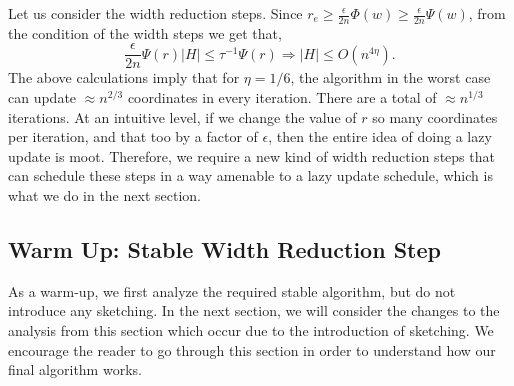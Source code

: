 \documentclass[11pt]{article}
\newcommand\rr{\boldsymbol{\mathit{r}}}
\newcommand\ww{\boldsymbol{\mathit{w}}}
\begin{document}
Let us consider the width reduction steps. Since $\rr_e\geq \frac{\epsilon}{2n}\Phi(\ww)\geq \frac{\epsilon}{2n}\Psi(\ww)$, from the condition of the width steps we get that,
\[
\frac{\epsilon}{2n}\Psi(\rr) |H| \leq\tau^{-1}\Psi(\rr) \Rightarrow |H|\leq O(n^{4\eta}).
\]
The above calculations imply that for $\eta = 1/6$, the algorithm in the worst case can update $\approx n^{2/3}$ coordinates in every iteration. There are a total of $\approx n^{1/3}$ iterations. At an intuitive level, if we change the value of $\rr$ so many coordinates per iteration, and that too by a factor of $\epsilon$, then the entire idea of doing a lazy update is moot. Therefore, we require a new kind of width reduction steps that can schedule these steps in a way amenable to a lazy update schedule, which is what we do in the next section.


\subsection{Warm Up: Stable Width Reduction Step}\label{sec:NonMonStab}

As a warm-up, we first analyze the required stable algorithm, but do not introduce any sketching. In the next section, we will consider the changes to the analysis from this section which occur due to the introduction of sketching. We encourage the reader to go through this section in order to understand how our final algorithm works.
\end{document}

